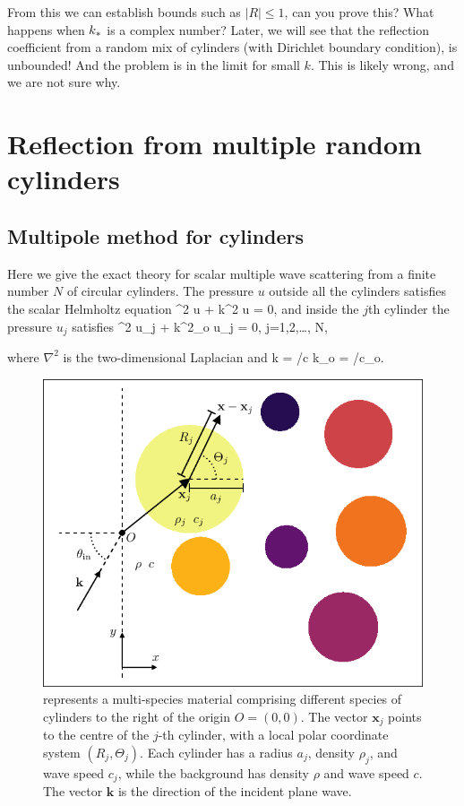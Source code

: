 \documentclass[ 12pt, a4paper]{article}
\begin{document}
From this we can establish bounds such as $|R|\leq 1$, can you prove this? What happens when $k_*$ is a complex number? Later, we will see that the reflection coefficient from a random mix of cylinders (with Dirichlet boundary condition), is unbounded! And the problem is in the limit for small $k$. This is likely wrong, and we are not sure why.


\section{Reflection from multiple random cylinders}

\subsection{Multipole method for cylinders}

Here we give the exact theory for scalar multiple wave scattering from a finite number $N$ of circular cylinders. The pressure $u$ outside all the cylinders satisfies the scalar Helmholtz equation
\be
\nabla^2 u + k^2 u = 0,
\en
and inside the $j$th cylinder the pressure $u_j$ satisfies
\be
  \nabla^2 u_j + k^2_o u_j = 0, \quad {} \; j=1,2,\ldots, N,
\en

where $\nabla^2$ is the two-dimensional Laplacian and
\be \label{eqns:wavenumbers}
	k = \omega/c \quad {} \quad k_o = \omega/c_o.
\en

\begin{figure}[t]
  \centering
  \includegraphics[width=0.72\linewidth]{multispecies.pdf}
  \caption{ represents a multi-species material comprising different species of cylinders to the right of the origin $O = (0,0)$. The vector $\mathbf x_j$ points to the centre of the $j$-th cylinder, with a local polar coordinate system $(R_j, \Theta_j)$. Each cylinder has a radius $a_j$, density $\rho_j$, and wave speed $c_j$, while the background has density $\rho$ and wave speed $c$. The vector $\mathbf k$ is the direction of the incident plane wave.  }
  \label{fig:multispecies}
\end{figure}
\end{document}
